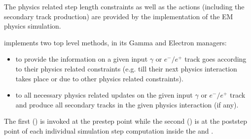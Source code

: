 \documentclass[letterpaper,10pt,english]{sphinxmanual}
\begin{document}
\begin{fulllineitems}
\begin{itemize}
\end{itemize}


\sphinxAtStartPar
The physics related step length constraints as well as the actions (including the secondary track production) are provided by the  implementation of the EM physics simulation.

\sphinxAtStartPar
{} implements two top level methods, in its Gamma and Electron managers:\begin{itemize}
\item {} 
\sphinxAtStartPar
to provide the information on  a given input \(\gamma\) or \(e^-/e^+\) track goes according to their physics related constraints (e.g. till their next physics interaction takes place or due to other physics related constraints).

\item {} 
\sphinxAtStartPar
to  all necessary physics related updates on the given input \(\gamma\) or \(e^-/e^+\) track and produce all secondary tracks in the given physics interaction (if any).

\end{itemize}


\sphinxAtStartPar
The first () is invoked at the pre\sphinxhyphen{}step point while the second () is at the post\sphinxhyphen{}step point of each individual simulation step computation inside the  and .


\end{fulllineitems}
\end{document}
